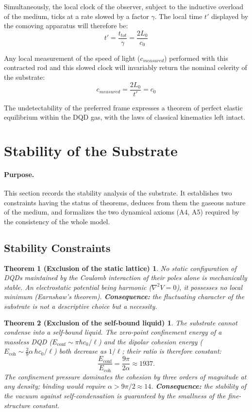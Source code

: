\documentclass[11pt,a4paper]{article}
\theoremstyle{plain}
\newtheorem*{thmA}{Theorem 1 (Exclusion of the static lattice)}
\newtheorem*{thmB}{Theorem 2 (Exclusion of the self-bound liquid)}
\theoremstyle{remark}
\begin{document}
Simultaneously, the local clock of the observer, subject to the inductive overload of the medium, ticks at a rate slowed by a factor $\gamma$. The local time $t'$ displayed by the comoving apparatus will therefore be:
\begin{equation}
t' = \frac{t_{tot}}{\gamma} = \frac{2L_0}{c_0}
\end{equation}

Any local measurement of the speed of light ($c_{measured}$) performed with this contracted rod and this slowed clock will invariably return the nominal celerity of the substrate:
\begin{equation}
c_{measured} = \frac{2L_0}{t'} = c_0
\end{equation}

The undetectability of the preferred frame expresses a theorem of perfect elastic equilibrium within the DQD gas, with the laws of classical kinematics left intact.

\section{Stability of the Substrate}
\label{sec:dynamic_balance}

\paragraph{Purpose.} This section records the stability analysis of the substrate. It establishes two constraints having the status of theorems, deduces from them the gaseous nature of the medium, and formalizes the two dynamical axioms (A4, A5) required by the consistency of the whole model.

\subsection{Stability Constraints}

\begin{thmA}
No static configuration of DQDs maintained by the Coulomb interaction of their poles alone is mechanically stable. An electrostatic potential being harmonic ($\nabla^2 V = 0$), it possesses no local minimum (Earnshaw's theorem). \textbf{Consequence:} the fluctuating character of the substrate is not a descriptive choice but a necessity.
\end{thmA}

\begin{thmB}
The substrate cannot condense into a self-bound liquid. The zero-point confinement energy of a massless DQD ($E_{\text{conf}} \sim \pi\hbar c_0/\ell$) and the dipolar cohesion energy ($E_{\text{coh}} \sim \tfrac{2}{9}\alpha\,\hbar c_0/\ell$) both decrease as $1/\ell$; their ratio is therefore constant:
\begin{equation}
\frac{E_{\text{conf}}}{E_{\text{coh}}} = \frac{9\pi}{2\alpha} \approx 1937 .
\end{equation}
The confinement pressure dominates the cohesion by three orders of magnitude at any density; binding would require $\alpha > 9\pi/2 \approx 14$. \textbf{Consequence:} the stability of the vacuum against self-condensation is guaranteed by the smallness of the fine-structure constant.
\end{thmB}
\end{document}
